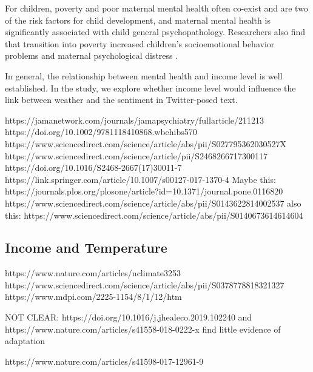 \documentclass{article}
\begin{document}
For children, poverty and poor maternal mental health often co-exist and are two of the risk factors for child development\citep{LUND20111502}, and maternal mental health is significantly associated with child general psychopathology\citep{ RN1289}. Researchers also find that transition into poverty increased children’s socioemotional behavior problems and maternal psychological distress \citep{WICKHAM2017e141}.

In general, the relationship between mental health and income level is well established. In the study, we explore whether income level would influence the link between weather and the sentiment in Twitter-posed text.

https://jamanetwork.com/journals/jamapsychiatry/fullarticle/211213
https://doi.org/10.1002/9781118410868.wbehibs570
https://www.sciencedirect.com/science/article/abs/pii/S027795362030527X
https://www.sciencedirect.com/science/article/pii/S2468266717300117
https://doi.org/10.1016/S2468-2667(17)30011-7
https://link.springer.com/article/10.1007/s00127-017-1370-4
Maybe this: https://journals.plos.org/plosone/article?id=10.1371/journal.pone.0116820
https://www.sciencedirect.com/science/article/abs/pii/S0143622814002537
also this: https://www.sciencedirect.com/science/article/abs/pii/S0140673614614604

\subsection{Income and Temperature}
https://www.nature.com/articles/nclimate3253
https://www.sciencedirect.com/science/article/abs/pii/S0378778818321327
https://www.mdpi.com/2225-1154/8/1/12/htm

NOT CLEAR: https://doi.org/10.1016/j.jhealeco.2019.102240 and https://www.nature.com/articles/s41558-018-0222-x find little evidence of adaptation



https://www.nature.com/articles/s41598-017-12961-9

\end{document}
